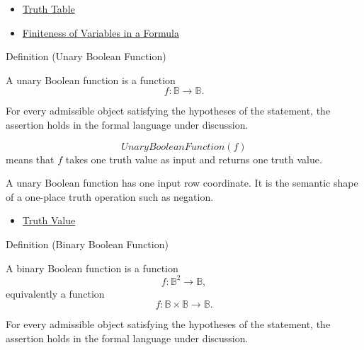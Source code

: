 \begin{dependencies}
\begin{itemize}
  \item \hyperref[def:truth-table-propositional-logic]{Truth Table}
  \item \hyperref[lem:finiteness-of-variables-propositional-formulas]{Finiteness of Variables in a Formula}
\end{itemize}
\end{dependencies}
\begin{definitionbox}{Definition (Unary Boolean Function)}
\begin{definition}
\label{def:unary-boolean-function-propositional-logic}
A unary Boolean function is a function
\[
f:\mathbb{B}\to\mathbb{B}.
\]
\end{definition}
\end{definitionbox}
\begin{remark*}
For every admissible object satisfying the hypotheses of the statement, the
assertion holds in the formal language under discussion.
\end{remark*}


\begin{remark*}
\[
UnaryBooleanFunction(f)
\]
means that \(f\) takes one truth value as input and returns one truth value.
\end{remark*}

\begin{remark*}[Interpretation]
A unary Boolean function has one input row coordinate. It is the semantic shape of a one-place truth operation such as negation.
\end{remark*}

\begin{dependencies}
\begin{itemize}
  \item \hyperref[def:truth-value-propositional-logic]{Truth Value}
\end{itemize}
\end{dependencies}
\begin{definitionbox}{Definition (Binary Boolean Function)}
\begin{definition}
\label{def:binary-boolean-function-propositional-logic}
A binary Boolean function is a function
\[
f:\mathbb{B}^2\to\mathbb{B},
\]
equivalently a function
\[
f:\mathbb{B}\times\mathbb{B}\to\mathbb{B}.
\]
\end{definition}
\end{definitionbox}
\begin{remark*}
For every admissible object satisfying the hypotheses of the statement, the
assertion holds in the formal language under discussion.
\end{remark*}


